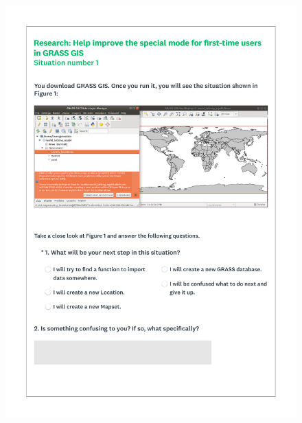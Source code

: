 \documentclass[a4paper,10pt,twoside]{article}
\begin{document}
 \newpage
 \begin{figure}[hbt!]
 \begin{center}
 \includegraphics[width=15.5cm]{../surveys/questionnaires/survey2-page3_questions1_2.pdf}
 \end{center}
 \end{figure}
 
\end{document}
